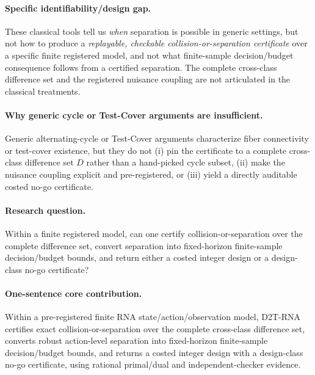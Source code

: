 \documentclass[11pt]{article}
\begin{document}
\paragraph{Specific identifiability/design gap.}
These classical tools tell us \emph{when} separation is possible in generic settings, but not how to
produce a \emph{replayable, checkable collision-or-separation certificate} over a specific finite
registered model, and not what finite-sample decision/budget consequence follows from a certified
separation. The complete cross-class difference set and the registered nuisance coupling are not
articulated in the classical treatments.

\paragraph{Why generic cycle or Test-Cover arguments are insufficient.}
Generic alternating-cycle or Test-Cover arguments characterize fiber connectivity or test-cover
existence, but they do not (i) pin the certificate to a complete cross-class difference set $D$ rather
than a hand-picked cycle subset, (ii) make the nuisance coupling explicit and pre-registered, or
(iii) yield a directly auditable costed no-go certificate.

\paragraph{Research question.}
Within a finite registered model, can one certify collision-or-separation over the complete difference
set, convert separation into fixed-horizon finite-sample decision/budget bounds, and return either a
costed integer design or a design-class no-go certificate?

\paragraph{One-sentence core contribution.}
Within a pre-registered finite RNA state/action/observation model, D2T-RNA certifies exact
collision-or-separation over the complete cross-class difference set, converts robust action-level
separation into fixed-horizon finite-sample decision/budget bounds, and returns a costed integer design
with a design-class no-go certificate, using rational primal/dual and independent-checker evidence.
\end{document}
